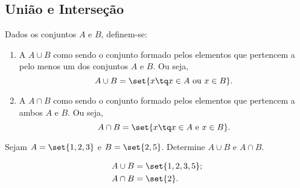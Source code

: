 \subsection{União e Interseção}

\begin{definition}
Dados os conjuntos $A$ e $B$, definem-se:

\begin{enumerate}
	\item A  $A \cup B$ como sendo o conjunto formado pelos elementos que pertencem a pelo menos um dos conjuntos $A$ e $B$. Ou seja,
		$$ A \cup B = \set{x \tq x \in A \text{ ou } x \in B} . $$
	\item A  $A \cap B$ como sendo o conjunto formado pelos elementos que pertencem a ambos $A$ e $B$. Ou seja,
		$$ A \cap B = \set{x \tq x \in A \text{ e } x \in B} . $$
\end{enumerate}
\end{definition}

\begin{example}
Sejam $A = \set{1, 2, 3}$ e $ B = \set{2,5}$. Determine $A \cup B$ e $A \cap B$.
\end{example}

\begin{solution}
\begin{align*}
	&A \cup B = \set{1,2,3,5};\\
	&A \cap B = \set{2}.\\
\end{align*}
\end{solution}

